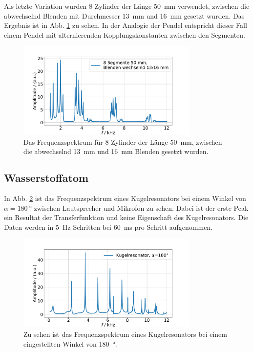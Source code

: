 Als letzte Variation wurden \num{8} Zylinder der Länge \SI{50}{\milli\metre} verwendet, zwischen die abwechselnd Blenden mit Durchmesser \SI{13}{\milli\metre} und \SI{16}{\milli\metre} gesetzt wurden. 
Das Ergebnis ist in Abb. \ref{fig:var5} zu sehen. In der Analogie der Pendel entspricht dieser Fall einem Pendel mit alternierenden Kopplungskonstanten zwischen den Segmenten.

\begin{figure}
    \centering
    \includegraphics[width=0.8\textwidth]{plots/B_6.pdf}
    \caption{Das Frequenzspektrum für 8 Zylinder der Länge \SI{50}{\milli\metre}, zwischen die abwechselnd \SI{13}{\milli\metre} und \SI{16}{\milli\metre} Blenden gesetzt wurden.}
    \label{fig:var5}
\end{figure}

\subsection{Wasserstoffatom}

In Abb. \ref{fig:Wasserstoff1} ist das Frequenzspektrum eines Kugelresonators bei einem Winkel von $\alpha = \SI{180}{\degree}$ zwischen Lautsprecher und Mikrofon zu sehen. Dabei ist der erste Peak ein Resultat der Transferfunktion und keine Eigenschaft des Kugelresonators. 
Die Daten werden in \SI{5}{\hertz} Schritten bei \SI{60}{\milli\second} pro Schritt aufgenommen. 

\begin{figure}
    \centering
    \includegraphics[width=0.8\textwidth]{plots/C_1.pdf}
    \caption{Zu sehen ist das Frequenzspektrum eines Kugelresonators bei einem eingestellten Winkel von \SI{180}{\degree}.}
    \label{fig:Wasserstoff1}
\end{figure}

